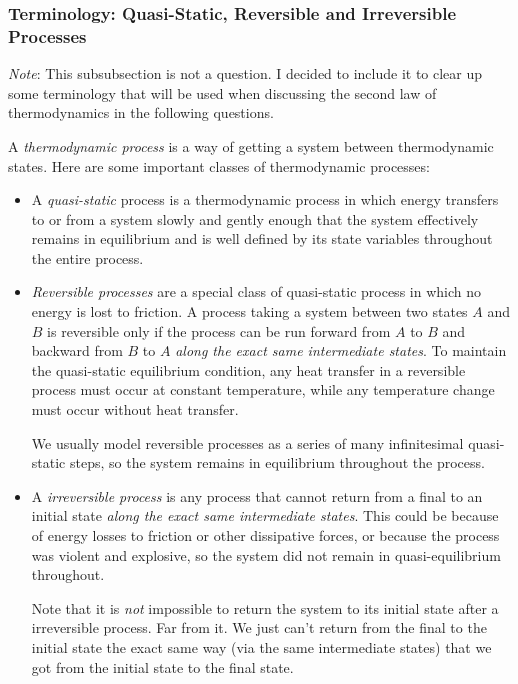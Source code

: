 \documentclass[11pt, a4paper]{article}
\begin{document}
\subsubsection{Terminology: Quasi-Static, Reversible and Irreversible Processes}
\textit{Note}: This subsubsection is not a question. I decided to include it to clear up some terminology that will be used when discussing the second law of thermodynamics in the following questions.

\vspace{2mm}

A \textit{thermodynamic process} is a way of getting a system between thermodynamic states. Here are some important classes of thermodynamic processes:
\begin{itemize}
	\item A \textit{quasi-static} process is a thermodynamic process in which energy transfers to or from a system slowly and gently enough that the system effectively remains in equilibrium and is well defined by its state variables throughout the entire process. 
	
	\item \textit{Reversible processes} are a special class of quasi-static process in which no energy is lost to friction. A process taking a system between two states $ A $ and $ B $ is reversible only if the process can be run forward from $ A $ to $ B $ and backward from $ B $ to $ A $ \textit{along the exact same intermediate states}. To maintain the quasi-static equilibrium condition, any heat transfer in a reversible process must occur at constant temperature, while any temperature change must occur without heat transfer.
	
	We usually model reversible processes as a series of many infinitesimal quasi-static steps, so the system remains in equilibrium throughout the process. 
	
	\item A \textit{irreversible process} is any process that cannot return from a final to an initial state \textit{along the exact same intermediate states}. This could be because of energy losses to friction or other dissipative forces, or because the process was violent and explosive, so the system did not remain in quasi-equilibrium throughout.
	
	Note that it is \textit{not} impossible to return the system to its initial state after a irreversible process. Far from it. We just can't return from the final to the initial state the exact same way (via the same intermediate states) that we got from the initial state to the final state.

	

\end{itemize}
\end{document}

